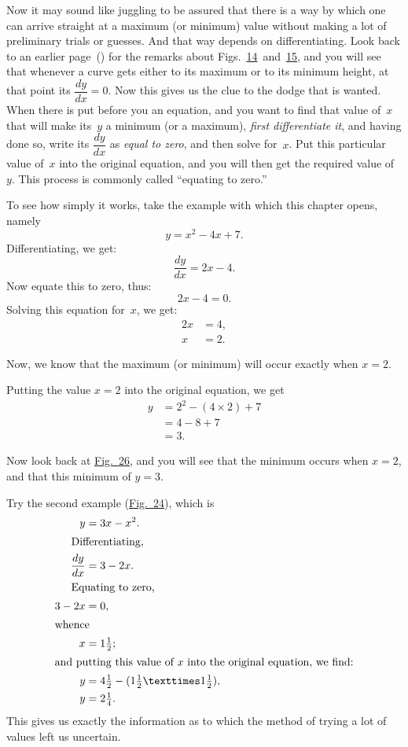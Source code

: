 \documentclass[12pt]{book}[2005/09/16]
\newcommand{\DPPageSep}[2]{\Pagelabel{#2}}
\newcommand{\Pagelabel}[1]
  {\phantomsection\label{#1}}
\newcommand{\Fig}[1]{\hyperref[fig:#1]{Fig.~#1}}
\newcommand{\Figs}[3]{%
  Figs.\ \hyperref[fig:#1]{#1}~#2~\hyperref[fig:#3]{#3}}
\begin{document}
Now it may sound like juggling to be assured that
there is a way by which one can arrive straight at a
maximum (or minimum) value without making a lot of
preliminary trials or guesses. And that way depends
on differentiating. Look back to an earlier page~(\pageref{curve}) for
the remarks about \Figs{14}{and}{15}, and you will see
that whenever a curve gets either to its maximum
or to its minimum height, at that point its $\dfrac{dy}{dx} = 0$.
Now this gives us the clue to the dodge that is
wanted. When there is put before you an equation,
and you want to find that value of~$x$ that will make
its~$y$ a minimum (or a maximum), \emph{first differentiate
it}, and having done so, write its $\dfrac{dy}{dx}$ as \emph{equal to zero},
and then solve for~$x$. Put this particular value of~$x$
into the original equation, and you will then get the
required value of~$y$. This process is commonly called
``equating to zero.''

To see how simply it works, take the example with
which this chapter opens, namely
\[
y = x^2 - 4x + 7.
\]
\DPPageSep{108.png}{96}%
%
Differentiating, we get:
\[
\dfrac{dy}{dx} = 2x - 4.
\]
Now equate this to zero, thus:
\[
2x - 4 = 0.
\]
Solving this equation for~$x$, we get:
\begin{align*}
2x &= 4, \\
 x &= 2.
\end{align*}

Now, we know that the maximum (or minimum)
will occur exactly when $x=2$.

Putting the value $x=2$ into the original equation,
we get %
\begin{align*}
y &= 2^2 - (4×2) + 7 \\
  &= 4 - 8 + 7       \\
  &= 3.
\end{align*}

Now look back at \Fig{26}, and you will see that the
minimum occurs when $x = 2$, and that this minimum
of $y = 3$.

Try the second example (\Fig{24}), which is
\begin{align*}
y &= 3x - x^2. \\
\intertext{\indent Differentiating,}
\frac{dy}{dx} &= 3 - 2x. \\
\intertext{\indent Equating to zero,}
3 - 2x &= 0, \\
\intertext{whence}
x &= 1 \tfrac{1}{2}; \\
\intertext{and putting this value of~$x$ into the original equation, we find:}
y &= 4 \tfrac{1}{2} - (1 \tfrac{1}{2} × 1 \tfrac{1}{2}), \\
y &= 2 \tfrac{1}{4}.
\end{align*}
This gives us exactly the information as to which
the method of trying a lot of values left us uncertain.
\DPPageSep{109.png}{97}%
\end{document}
